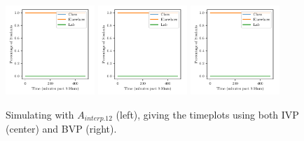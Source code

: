 \documentclass[11pt]{amsart}
\begin{document}
\begin{figure}[htp]
    \centering
    \includegraphics[width=0.3\textwidth]{temp.pdf}\hfill
    \includegraphics[width=0.3\textwidth]{temp.pdf}\hfill
    \includegraphics[width=0.3\textwidth]{temp.pdf}\hfill
    \caption{Simulating with $A_{interp.12}$ (left), giving the timeplots using both IVP (center) and BVP (right).}
    \label{fig:continuous_alpha}

\end{figure}









\FloatBarrier %
\newpage

\end{document}

